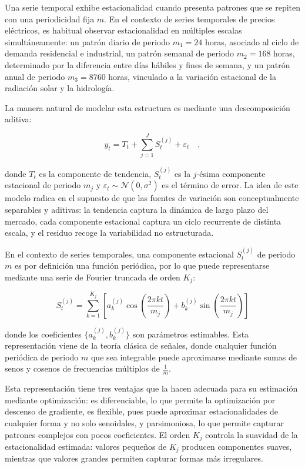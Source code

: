 Una serie temporal exhibe estacionalidad cuando presenta patrones que se repiten con una periodicidad fija $m$. En el contexto de series temporales de precios eléctricos, es habitual observar estacionalidad en múltiples escalas simultáneamente: un patrón diario de periodo $m_1=24$ horas, asociado al ciclo de demanda residencial e industrial, un patrón semanal de periodo $m_2=168$ horas, determinado por la diferencia entre días hábiles y fines de semana, y un patrón anual de periodo $m_3=8760$ horas, vinculado a la variación estacional de la radiación solar y la hidrología.

La manera natural de modelar esta estructura es mediante una descomposición aditiva:

\begin{equation}
    y_t = T_t + \sum_{j=1}^{J} S_t^{(j)} + \varepsilon_t\quad,
\end{equation}

donde $T_t$ es la componente de tendencia, $S_t^{(j)}$ es la $j$-ésima componente estacional de periodo $m_j$ y $\varepsilon_t \sim \mathcal{N}(0, \sigma^2)$ es el término de error. La idea de este modelo radica en el supuesto de que las fuentes de variación son conceptualmente separables y aditivas: la tendencia captura la dinámica de largo plazo del mercado, cada componente estacional captura un ciclo recurrente de distinta escala, y el residuo recoge la variabilidad no estructurada.

En el contexto de series temporales, una componente estacional $S_t^{(j)}$ de periodo $m$ es por definición una función periódica, por lo que puede representarse mediante una serie de Fourier truncada de orden $K_j$:

\begin{equation}
    S_t^{(j)} = \sum_{k=1}^{K_j} \left[ a_k^{(j)} \cos\left(\frac{2\pi k t}{m_j}\right) + b_k^{(j)} \sin\left(\frac{2\pi k t}{m_j}\right) \right]
    \label{eq:fourier_seasonality}
\end{equation}

donde los coeficientes $\{a_k^{(j)}, b_k^{(j)}\}$ son parámetros estimables. Esta representación viene de la teoría clásica de señales, donde cualquier función periódica de periodo $m$ que sea integrable puede aproximarse mediante sumas de senos y cosenos de frecuencias múltiplos de $\frac{1}{m}$.

Esta representación tiene tres ventajas que la hacen adecuada para su estimación mediante optimización: es diferenciable, lo que permite la optimización por descenso de gradiente, es flexible, pues puede aproximar estacionalidades de cualquier forma y no solo senoidales, y parsimoniosa, lo que permite capturar patrones complejos con pocos coeficientes. El orden $K_j$ controla la suavidad de la estacionalidad estimada: valores pequeños de $K_j$ producen componentes suaves, mientras que valores grandes permiten capturar formas más irregulares.

